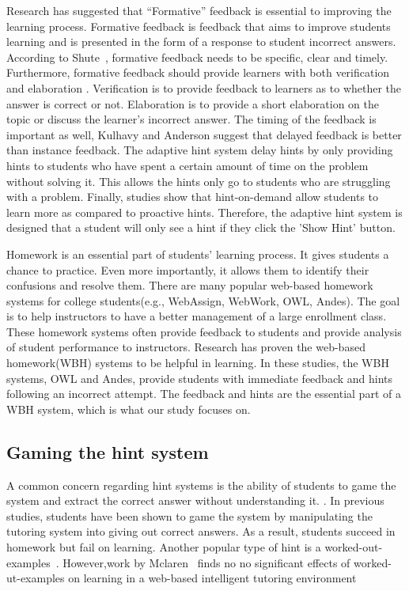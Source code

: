 \documentclass{sigchi}
\begin{document}
Research has suggested that ``Formative'' feedback is essential to improving the learning process\cite{Azevedo1995}\cite{Bangert-Drowns1991}. Formative feedback is feedback that aims to improve students learning and is presented in the form of a response to student incorrect answers\cite{Shute2008}. According to Shute~\cite{Shute2008}, formative feedback needs to be specific, clear and timely. Furthermore, formative feedback should provide learners with both verification and elaboration \cite{Mason2001} \cite{Bangert-Drowns1991}. Verification is to provide feedback to learners as to whether the answer is correct or not. Elaboration is to provide a short elaboration on the topic or discuss the learner's incorrect answer. The timing of the feedback is important as well, Kulhavy and Anderson suggest that delayed feedback is better than instance feedback\cite{Kulhavy1972}. The adaptive hint system delay hints by only providing hints to students who have spent a certain amount of time on the problem without solving it. This allows the hints only go to students who are struggling with a problem. Finally, studies show that hint-on-demand allow students to learn more as compared to proactive hints\cite{Razzaq2010}. Therefore, the adaptive hint system is designed that a student will only see a hint if they click the 'Show Hint' button.

Homework is an essential part of students' learning process\cite{Cooper2006}. It gives students a chance to practice. Even more importantly, it allows them to identify their confusions and resolve them. There are many popular web-based homework systems for college students(e.g., WebAssign, WebWork, OWL, Andes). The goal is to help instructors to have a better management of a large enrollment class. These homework systems often provide feedback to students and provide analysis of student performance to instructors. Research has proven the web-based homework(WBH) systems to be helpful in learning\cite{MestHartRath2002}\cite{Vanlehn2005}. In these studies, the WBH systems, OWL and Andes, provide students with immediate feedback and hints following an incorrect attempt\cite{MestHartRath2002}\cite{Vanlehn2005}. The feedback and hints are the essential part of a WBH system, which is what our study focuses on.

\subsection*{Gaming the hint system}

A common concern regarding hint systems is the ability of students to
game the system and extract the correct answer without understanding
it.  \cite{Baker2004}\cite{Baker2005}. In previous studies, students
have been shown to game the system by manipulating the tutoring system
into giving out correct answers\cite{Baker2004Off-task}. As a result,
students succeed in homework but fail on learning. Another popular
type of hint is a worked-out-examples~\cite{Atkinson2000}.
However,work by Mclaren~\cite{McLaren2006} finds no no significant
effects of worked-ut-examples on learning in a web-based intelligent
tutoring environment
\end{document}
